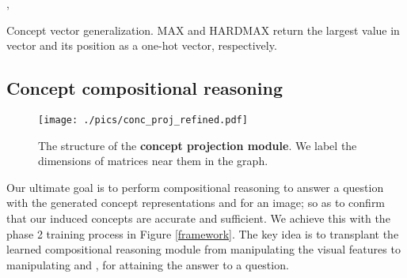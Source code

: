 \documentclass[10pt,twocolumn,letterpaper]{article}
\begin{document}
\begin{algorithm}[t]
\small
\SetAlgoLined
\KwResult{, }
 , \\
 \caption{\small{Concept vector generalization. MAX and HARDMAX return the largest value in vector  and its position as a one-hot vector, respectively.}}
 \label{conc_gen}
\end{algorithm}

\vspace{-1mm}
\subsection{Concept compositional reasoning}
\vspace{-1mm}
\label{ssec:concept_reasoning}
\begin{figure}
\centering
\texttt{[image: ./pics/conc\_proj\_refined.pdf]}
\caption{The structure of the \textbf{concept projection module}. We label the dimensions of matrices near them in the graph.}
\label{conc_proj}
\vspace{-6mm}
\end{figure}

Our ultimate goal is to perform compositional reasoning to answer a question with the generated concept representations  and  for an image; so as to confirm that our induced concepts are accurate and sufficient. We achieve this with the phase 2 training process in Figure \ref{framework}.
The key idea is to transplant the learned compositional reasoning module from manipulating the visual features to manipulating  and , for attaining the answer to a question.
\end{document}
